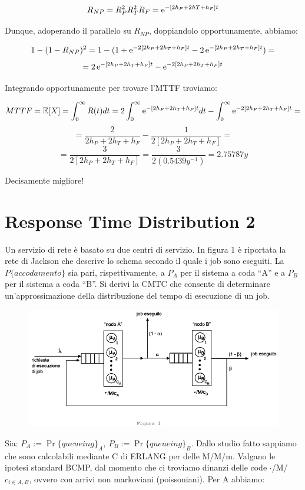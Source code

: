 \begin{itemize}
\[
	R_{NP} = R_P^2 R_T^2 R_F = \mathop{}\!\mathrm{e}^{-[2h_P+2hT+h_F]t}
\]

Dunque, adoperando il parallelo su $R_{NP}$, doppiandolo opportunamente, abbiamo:

\[
	1-(1-R_{NP})^2 = 1-(1+\mathop{}\!\mathrm{e}^{-2[2h_P+2h_T+h_F]t} -2\mathop{}\!\mathrm{e}^{-[2h_P+2h_T+h_F]t}) =
\]
\[
	= 2\mathop{}\!\mathrm{e}^{-[2h_P+2h_T+h_F]t} - \mathop{}\!\mathrm{e}^{-2[2h_P+2h_T+h_F]t}
\]

Integrando opportunamente per trovare l'MTTF troviamo:

\[
	MTTF = \operatorname{\mathbb{E}}[X] = \int_0^\infty{R(t)dt} = 2\int_0^\infty{\mathop{}\!\mathrm{e}^{-[2h_P+2h_T+h_F]t}dt} - \int_0^\infty{\mathop{}\!\mathrm{e}^{-2[2h_P+2h_T+h_F]t}} =
\]
\[
	= \frac{2}{2h_P+2h_T+h_F}-\frac{1}{2[2h_P+2h_T+h_F]} =
\]
\[
	= \frac{3}{2[2h_P+2h_T+h_F]} = \frac{3}{2(0.5439y^{-1})} = 2.75787y
\]

Decisamente migliore!

\end{itemize}


\section{Response Time Distribution 2}

Un servizio di rete è basato su due centri di servizio. In figura 1 è riportata 
la rete di Jackson che descrive lo schema secondo il quale i job sono eseguiti. 
La $P\{accodamento\}$ sia pari, rispettivamente, a $P_A$ per il sistema a coda “A” e a 
$P_B$  per il sistema a coda “B”. Si derivi la CMTC che consente di determinare 
un’approssimazione della distribuzione del tempo di esecuzione di un job.

\begin{center}
\begin{figure}[H]
\centering
\includegraphics[scale=0.8]{figures/ex/rtd2.png}
\end{figure}
\end{center}

Sia: $P_A:=\Pr\{queueing\}_A,\ P_B:=\Pr\{queueing\}_B$. Dallo studio fatto sappiamo che sono calcolabili mediante C di ERLANG per delle M/M/m. Valgano le ipotesi standard BCMP, dal momento che ci troviamo dinanzi delle code $\mathord{\cdot}$/M/$c_{i\in{A,B}}$, ovvero con arrivi non markoviani (poissoniani). Per A abbiamo:

